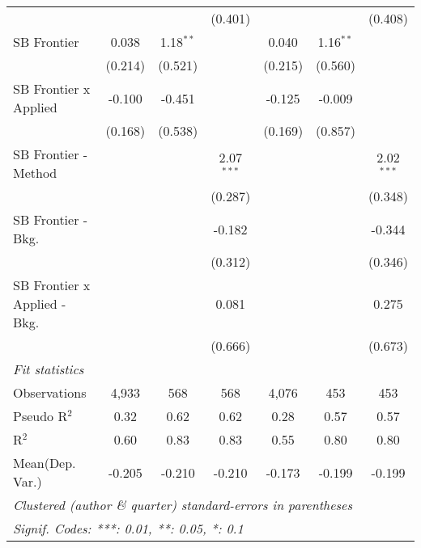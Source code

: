 \begin{tabular}{lcccccc}
                                  &         &             & (0.401)       &              &             & (0.408)\\   
   SB Frontier                    & 0.038   & 1.18$^{**}$ &               & 0.040        & 1.16$^{**}$ &   \\   
                                  & (0.214) & (0.521)     &               & (0.215)      & (0.560)     &   \\   
   SB Frontier x Applied          & -0.100  & -0.451      &               & -0.125       & -0.009      &   \\   
                                  & (0.168) & (0.538)     &               & (0.169)      & (0.857)     &   \\   
   SB Frontier - Method           &         &             & 2.07$^{***}$  &              &             & 2.02$^{***}$\\   
                                  &         &             & (0.287)       &              &             & (0.348)\\   
   SB Frontier - Bkg.             &         &             & -0.182        &              &             & -0.344\\   
                                  &         &             & (0.312)       &              &             & (0.346)\\   
   SB Frontier x Applied - Bkg.   &         &             & 0.081         &              &             & 0.275\\   
                                  &         &             & (0.666)       &              &             & (0.673)\\   
   \midrule
   \emph{Fit statistics}\\
   Observations                   & 4,933   & 568         & 568           & 4,076        & 453         & 453\\  
   Pseudo R$^2$                   & 0.32    & 0.62        & 0.62          & 0.28         & 0.57        & 0.57\\  
   R$^2$                          & 0.60    & 0.83        & 0.83          & 0.55         & 0.80        & 0.80\\  
Mean(Dep. Var.) & -0.205 & -0.210 & -0.210 & -0.173 & -0.199 & -0.199 \\
   \midrule \midrule
   \multicolumn{7}{l}{\emph{Clustered (author \& quarter) standard-errors in parentheses}}\\
   \multicolumn{7}{l}{\emph{Signif. Codes: ***: 0.01, **: 0.05, *: 0.1}}\\
\end{tabular}
\par\endgroup
